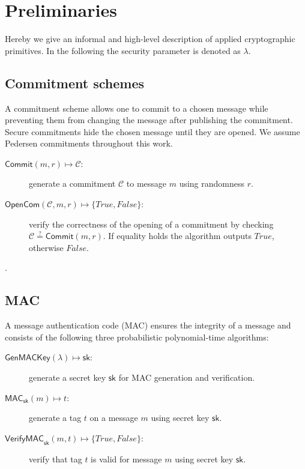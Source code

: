 \documentclass[a4paper]{article}
\begin{document}
\section{Preliminaries}\label{sec:preliminaries}

Hereby we give an informal and high-level description of applied cryptographic primitives. In the following the security parameter is denoted as $\lambda$.

\subsection{Commitment schemes}
A commitment scheme allows one to commit to a chosen message while preventing them from changing the message after publishing the commitment. Secure commitments hide the chosen message until they are opened. We assume Pedersen commitments throughout this work.

\begin{description}

\item[$\mathsf{Commit}(m,r)\mapsto{}\mathcal{C}$:] generate a commitment $\mathcal{C}$ to message $m$ using randomness $r$.

\item[$\mathsf{OpenCom}(\mathcal{C},m,r)\mapsto{}\{\mathit{True},\mathit{False}\}$:] verify the correctness of the opening of a commitment by checking $\mathcal{C}\stackrel{?}{=}\mathsf{Commit}(m,r)$. If equality holds the algorithm outputs $\mathit{True}$, otherwise $\mathit{False}$.

\end{description}.

\subsection{MAC}
A message authentication code (MAC) ensures the integrity of a message and consists of the following three probabilistic polynomial-time algorithms:

\begin{description}

\item[$\mathsf{GenMACKey}(\lambda)\mapsto{}{\mathsf{sk}}$:] generate a secret key $\mathsf{sk}$ for MAC generation and verification.

\item[$\mathsf{MAC}_{\mathsf{sk}}(m)\mapsto{}t$:] generate a tag $t$ on a message $m$ using secret key $\mathsf{sk}$.

\item[$\mathsf{VerifyMAC}_{\mathsf{sk}}(m,t)\mapsto{}\{\mathit{True},\mathit{False}\}$:] verify that tag $t$ is valid for message $m$ using secret key $\mathsf{sk}$.

\end{description}
\end{document}
